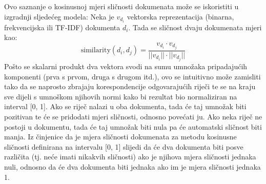 \documentclass[times, utf8, zavrsni]{fer}
\begin{document}
Ovo saznanje o kosinusnoj mjeri sličnosti dokumenata može se iskoristiti u izgradnji sljedećeg modela: Neka je $v_{d_i}$ vektorska reprezentacija (binarna, frekvencijska ili TF-IDF) dokumenta $d_{i}$. Tada se sličnost dvaju dokumenata mjeri kao:
\begin{equation}
{\displaystyle {\text{similarity}}(d_{i}, d_{j})}={\frac{v_{d_i} \cdot v_{d_j}}{||v_{d_i}|| \cdot ||v_{d_j}||}}
\end{equation}
Pošto se skalarni produkt dva vektora svodi na sumu umnožaka pripadajućih komponenti (prva s prvom, druga s drugom itd.), ovo se intuitivno može zamisliti tako da se naprosto zbrajaju korespondencije odgovarajućih riječi te se na kraju sve dijeli s umnoškom njihovih normi kako bi rezultat bio normaliziran na interval [0, 1]. Ako se riječ nalazi u oba dokumenta, tada će taj umnožak biti pozitivan te će se pridodati mjeri sličnosti, odnosno povećati ju. Ako neka riječ ne postoji u dokumentu, tada će taj umnožak biti nula pa će automatski sličnost biti manja. Iz činjenice da je mjera sličnosti dokumenata za metodu kosinusne sličnosti definirana na intervalu [0, 1] slijedi da će dva dokumenta biti posve različita (tj. neće imati nikakvih sličnosti) ako je njihova mjera sličnosti jednaka nuli, odnosno da će dva dokumenta biti jednaka ako im je mjera sličnosti jednaka 1.
\end{document}
